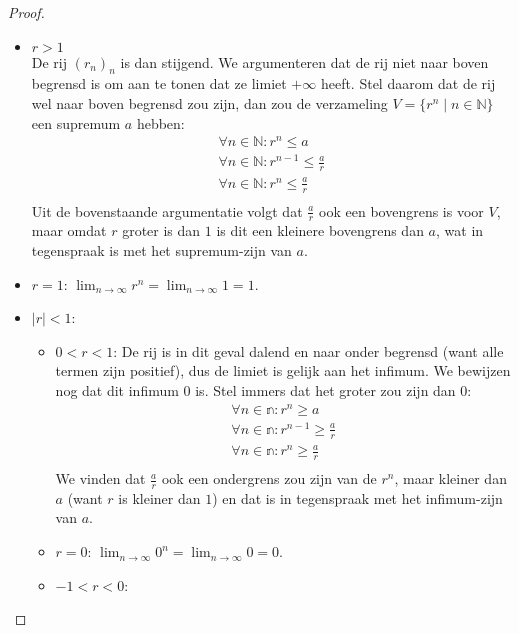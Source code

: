 \documentclass[main.tex]{subfiles}
\begin{document}
\begin{bpr}
  \begin{proof}
    \begin{itemize}
    \item $r>1$\\
      De rij $(r_{n})_{n}$ is dan stijgend.
      We argumenteren dat de rij niet naar boven begrensd is om aan te tonen dat ze limiet $+\infty$ heeft.
      Stel daarom dat de rij wel naar boven begrensd zou zijn, dan zou de verzameling $V=\{ r^{n}\mid n\in \mathbb{N}\}$ een supremum $a$ hebben:
      \[
      \begin{array}{c}
        \forall n\in \mathbb{N}: r^{n} \le a\\
        \forall n\in \mathbb{N}: r^{n-1} \le \frac{a}{r}\\
        \forall n\in \mathbb{N}: r^{n} \le \frac{a}{r}\\
      \end{array}
      \]
      Uit de bovenstaande argumentatie volgt dat $\frac{a}{r}$ ook een bovengrens is voor $V$, maar omdat $r$ groter is dan $1$ is dit een kleinere bovengrens dan $a$, wat in tegenspraak is met het supremum-zijn van $a$.
    \item $r=1$: $\lim_{n \rightarrow \infty}r^{n}=\lim_{n \rightarrow \infty}1=1$.
    \item $|r|<1$:
      \begin{itemize}
      \item $0<r<1$:
        De rij is in dit geval dalend \needed en naar onder begrensd (want alle termen zijn positief), dus de limiet is gelijk aan het infimum.
        We bewijzen nog dat dit infimum $0$ is.
        Stel immers dat het groter zou zijn dan $0$:
        \[
        \begin{array}{c}
          \forall n\in \mathbb{n}: r^{n} \ge a\\
          \forall n\in \mathbb{n}: r^{n-1} \ge \frac{a}{r}\\
          \forall n\in \mathbb{n}: r^{n} \ge \frac{a}{r}\\
        \end{array}
        \]
        We vinden dat $\frac{a}{r}$ ook een ondergrens zou zijn van de $r^{n}$, maar kleiner dan $a$ (want $r$ is kleiner dan $1$) en dat is in tegenspraak met het infimum-zijn van $a$.
      \item $r=0$: $\lim_{n \rightarrow \infty}0^{n}=\lim_{n \rightarrow \infty}0=0$.
      \item $-1<r<0$:

\end{itemize}
\end{itemize}
\end{proof}
\end{bpr}
\end{document}
